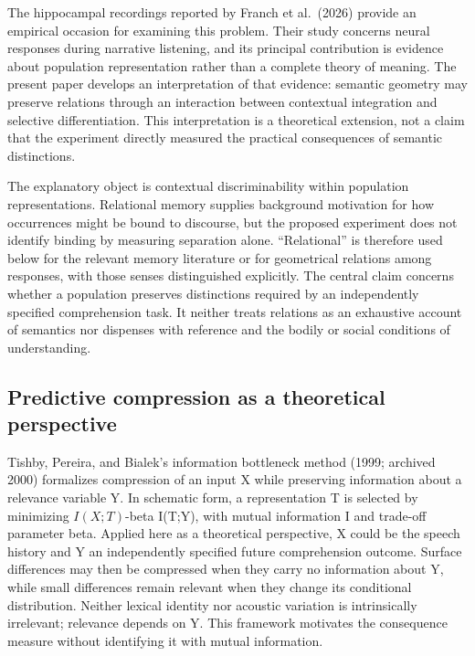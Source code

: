 \documentclass[11pt]{article}
\begin{document}
The hippocampal recordings reported by Franch et al.~(2026) provide an
empirical occasion for examining this problem. Their study concerns
neural responses during narrative listening, and its principal
contribution is evidence about population representation rather than a
complete theory of meaning. The present paper develops an interpretation
of that evidence: semantic geometry may preserve relations through an
interaction between contextual integration and selective
differentiation. This interpretation is a theoretical extension, not a
claim that the experiment directly measured the practical consequences
of semantic distinctions.

The explanatory object is contextual discriminability within population
representations. Relational memory supplies background motivation for
how occurrences might be bound to discourse, but the proposed experiment
does not identify binding by measuring separation alone. ``Relational''
is therefore used below for the relevant memory literature or for
geometrical relations among responses, with those senses distinguished
explicitly. The central claim concerns whether a population preserves
distinctions required by an independently specified comprehension task.
It neither treats relations as an exhaustive account of semantics nor
dispenses with reference and the bodily or social conditions of
understanding.

\hypertarget{predictive-compression-as-a-theoretical-perspective}{%
\subsection{Predictive compression as a theoretical
perspective}\label{predictive-compression-as-a-theoretical-perspective}}

Tishby, Pereira, and Bialek's information bottleneck method (1999;
archived 2000) formalizes compression of an input X while preserving
information about a relevance variable Y. In schematic form, a
representation T is selected by minimizing \(I(X;T)\)-beta I(T;Y), with
mutual information I and trade-off parameter beta. Applied here as a
theoretical perspective, X could be the speech history and Y an
independently specified future comprehension outcome. Surface
differences may then be compressed when they carry no information about
Y, while small differences remain relevant when they change its
conditional distribution. Neither lexical identity nor acoustic
variation is intrinsically irrelevant; relevance depends on Y. This
framework motivates the consequence measure without identifying it with
mutual information.
\end{document}
